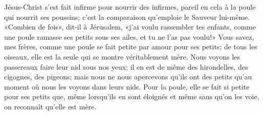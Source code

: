 Jésus-Christ s’est fait infirme pour nourrir des infirmes,
	pareil en cela à la poule qui nourrit ses poussins;
	c’est la comparaison qu’emploie le Sauveur lui-même.
«Combien de fois», dit-il à Jérusalem, «j’ai voulu rassembler tes enfants,
	comme une poule ramasse ses petits sous ses ailes,
	et tu ne l’as pas voulu!»
Vous savez, mes frères, comme une poule se fait petite par amour pour ses petits;
	de tous les oiseaux, elle est la seule qui se montre véritablement mère.
Nous voyons les passereaux faire leur nid sous nos yeux;
	il en est de même des hirondelles, des cigognes, des pigeons;
	mais nous ne nous apercevons qu’ils ont des petits
		qu’au moment où nous les voyons dans leurs nids.
Pour la poule, elle se fait si petite pour ses petits que,
	même lorsqu’ils en sont éloignés et même sans qu’on les voie,
	on reconnaît qu’elle est mère.
